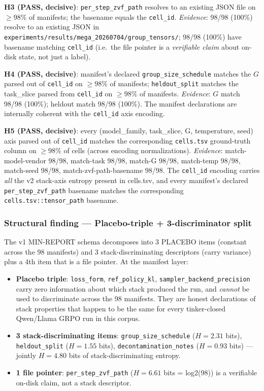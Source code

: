 \textbf{H3 (PASS, decisive)}: \texttt{per\_step\_zvf\_path} resolves to an existing JSON file on $\ge 98\%$ of manifests; the basename equals the \texttt{cell\_id}. \emph{Evidence}: 98/98 (100\%) resolve to an existing JSON in \texttt{experiments/results/mega\_20260704/group\_tensors/}; 98/98 (100\%) have basename matching \texttt{cell\_id} (i.e.\ the file pointer is a \emph{verifiable claim} about on-disk state, not just a label).

\textbf{H4 (PASS, decisive)}: manifest's declared \texttt{group\_size\_schedule} matches the $G$ parsed out of \texttt{cell\_id} on $\ge 98\%$ of manifests; \texttt{heldout\_split} matches the task\_slice parsed from \texttt{cell\_id} on $\ge 98\%$ of manifests. \emph{Evidence}: $G$ match 98/98 (100\%); heldout match 98/98 (100\%). The manifest declarations are internally coherent with the \texttt{cell\_id} axis encoding.

\textbf{H5 (PASS, decisive)}: every (model\_family, task\_slice, G, temperature, seed) axis parsed out of \texttt{cell\_id} matches the corresponding \texttt{cells.tsv} ground-truth column on $\ge 98\%$ of cells (across encoding normalizations). \emph{Evidence}: match-model-vendor 98/98, match-task 98/98, match-G 98/98, match-temp 98/98, match-seed 98/98, match-zvf-path-basename 98/98. The \texttt{cell\_id} encoding carries \emph{all} the v2 stack-axis entropy present in cells.tsv, and every manifest's declared \texttt{per\_step\_zvf\_path} basename matches the corresponding \texttt{cells.tsv::tensor\_path} basename.

\subsubsection{Structural finding --- Placebo-triple + 3-discriminator split}
\label{sec:p5-iter169-placebo-triple}

The v1 MIN-REPORT schema decomposes into 3 PLACEBO items (constant across the 98 manifests) and 3 stack-discriminating descriptors (carry variance) plus a 4th item that is a file pointer. At the manifest layer:
\begin{itemize}
  \item \textbf{Placebo triple}: \texttt{loss\_form}, \texttt{ref\_policy\_kl}, \texttt{sampler\_backend\_precision} carry zero information about which stack produced the run, and \emph{cannot} be used to discriminate across the 98 manifests. They are honest declarations of stack properties that happen to be the same for every tinker-closed Qwen/Llama GRPO run in this corpus.
  \item \textbf{3 stack-discriminating items}: \texttt{group\_size\_schedule} ($H{=}2.31$ bits), \texttt{heldout\_split} ($H{=}1.55$ bits), \texttt{decontamination\_notes} ($H{=}0.93$ bits) --- jointly $H{=}4.80$ bits of stack-discriminating entropy.
  \item \textbf{1 file pointer}: \texttt{per\_step\_zvf\_path} ($H{=}6.61$ bits = log2(98)) is a verifiable on-disk claim, not a stack descriptor.
\end{itemize}

